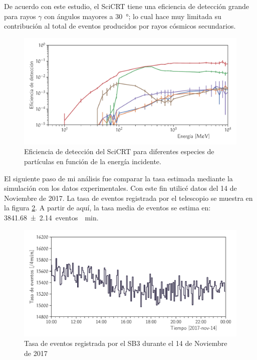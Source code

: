 De acuerdo con este estudio, el SciCRT tiene una eficiencia de detección grande para rayos $\gamma$ con ángulos mayores a \SI{30}{\degree}; lo cual hace muy limitada su contribución al total de eventos producidos por rayos cósmicos secundarios.

\begin{figure}
        \centering
        \includegraphics[width=\textwidth]{scibar-efficiency.pdf}
        \caption{Eficiencia de detección del SciCRT para diferentes especies de partículas en función de la energía incidente.}
        \label{fig:total-efficiency}
\end{figure}

El siguiente paso de mi análisis fue comparar la tasa estimada mediante la simulación con los datos experimentales. Con este fin utilicé datos del \num{14} de Noviembre de \num{2017}. La tasa de eventos registrada por el telescopio se muestra en la figura \ref{fig:neutron-1pix}. A partir de aquí, la tasa media de eventos se estima en: \SI{3841.68(214)}{eventos \per\minute}.

\begin{figure}
        \centering
        \includegraphics[width=\textwidth]{neutron-171114-1pix.pdf}
        \caption{Tasa de eventos registrada por el SB3 durante el \num{14} de Noviembre de \num{2017}}
        \label{fig:neutron-1pix}
\end{figure}

